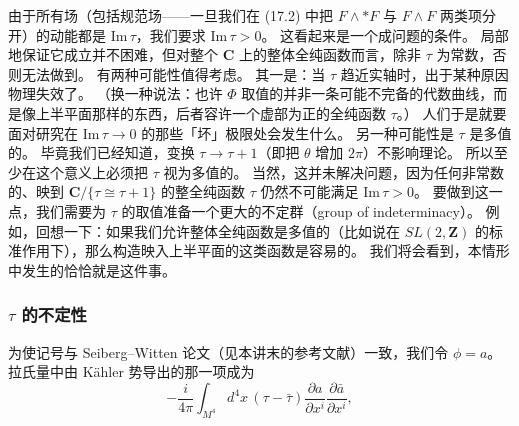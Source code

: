 
由于所有场（包括规范场——一旦我们在 (17.2) 中把 $F\wedge*F$ 与 $F\wedge F$ 两类项分开）的动能都是 $\mathrm{Im}\,\tau$，我们要求 $\mathrm{Im}\,\tau>0$。
这看起来是一个成问题的条件。
局部地保证它成立并不困难，但对整个 $\mathbf{C}$ 上的整体全纯函数而言，除非 $\tau$ 为常数，否则无法做到。
有两种可能性值得考虑。
其一是：当 $\tau$ 趋近实轴时，出于某种原因物理失效了。
（换一种说法：也许 $\Phi$ 取值的并非一条可能不完备的代数曲线，而是像上半平面那样的东西，后者容许一个虚部为正的全纯函数 $\tau$。）
人们于是就要面对研究在 $\mathrm{Im}\,\tau\to0$ 的那些「坏」极限处会发生什么。
另一种可能性是 $\tau$ 是多值的。
毕竟我们已经知道，变换 $\tau\to\tau+1$（即把 $\theta$ 增加 $2\pi$）不影响理论。
所以至少在这个意义上必须把 $\tau$ 视为多值的。
当然，这并未解决问题，因为任何非常数的、映到 $\mathbf{C}/\{\tau\cong\tau+1\}$ 的整全纯函数 $\tau$ 仍然不可能满足 $\mathrm{Im}\,\tau>0$。
要做到这一点，我们需要为 $\tau$ 的取值准备一个更大的不定群（group of indeterminacy）。
例如，回想一下：如果我们允许整体全纯函数是多值的（比如说在 $SL(2,\mathbf{Z})$ 的标准作用下），那么构造映入上半平面的这类函数是容易的。
我们将会看到，本情形中发生的恰恰就是这件事。

\subsubsection{$\tau$ 的不定性}

为使记号与 Seiberg--Witten 论文（见本讲末的参考文献）一致，我们令 $\phi=a$。
拉氏量中由 Kähler 势导出的那一项成为
\[
-\frac{i}{4\pi}\int_{M^4}d^4x\,(\tau-\bar\tau)\frac{\partial a}{\partial x^i}\frac{\partial\bar a}{\partial x^i},
\]


